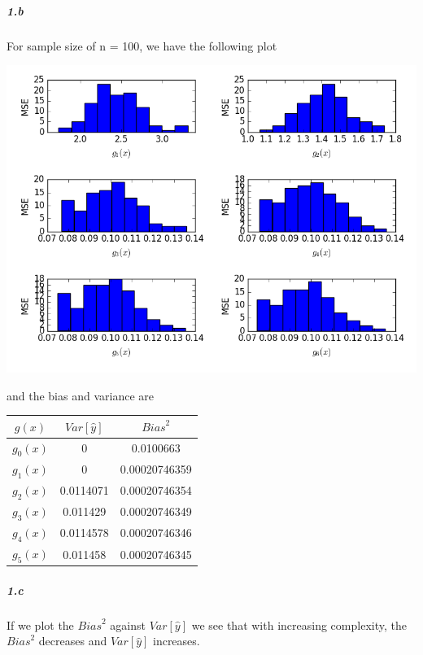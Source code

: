 \documentclass[]{report}
\begin{document}
\subparagraph{1.b}
	For sample size of n = 100, we have the following plot
	\begin{center}
		\includegraphics[width=\textwidth]{fig_100_MSE}
	\end{center}

	and the bias and variance are

	\begin{center}
		\begin{tabular}{c|c|c}
			\hline
			 $g(x)$     &   $Var[\hat{y}]$ &   ${Bias}^2$ \\
			\hline
			 $g_0 (x)$ &      0           & 0.0100663   \\
			 $g_1 (x)$ &      0  		  & 0.00020746359 \\
			 $g_2 (x)$ &      0.0114071   & 0.00020746354 \\
			 $g_3 (x)$ &      0.011429    & 0.00020746349 \\
			 $g_4 (x)$ &      0.0114578   & 0.00020746346 \\
			 $g_5 (x)$ &      0.011458    & 0.00020746345 \\
			\hline
			\end{tabular}
	\end{center}

\subparagraph{1.c}
	If we plot the ${Bias}^2$ against $Var[\hat{y}]$ we see that with increasing complexity, the ${Bias}^2$ decreases and $Var[\hat{y}]$
	increases.
\end{document}
